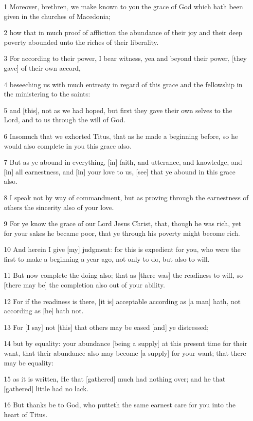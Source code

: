 \par 1 Moreover, brethren, we make known to you the grace of God which hath been given in the churches of Macedonia;
\par 2 how that in much proof of affliction the abundance of their joy and their deep poverty abounded unto the riches of their liberality.
\par 3 For according to their power, I bear witness, yea and beyond their power, [they gave] of their own accord,
\par 4 beseeching us with much entreaty in regard of this grace and the fellowship in the ministering to the saints:
\par 5 and [this], not as we had hoped, but first they gave their own selves to the Lord, and to us through the will of God.
\par 6 Insomuch that we exhorted Titus, that as he made a beginning before, so he would also complete in you this grace also.
\par 7 But as ye abound in everything, [in] faith, and utterance, and knowledge, and [in] all earnestness, and [in] your love to us, [see] that ye abound in this grace also.
\par 8 I speak not by way of commandment, but as proving through the earnestness of others the sincerity also of your love.
\par 9 For ye know the grace of our Lord Jesus Christ, that, though he was rich, yet for your sakes he became poor, that ye through his poverty might become rich.
\par 10 And herein I give [my] judgment: for this is expedient for you, who were the first to make a beginning a year ago, not only to do, but also to will.
\par 11 But now complete the doing also; that as [there was] the readiness to will, so [there may be] the completion also out of your ability.
\par 12 For if the readiness is there, [it is] acceptable according as [a man] hath, not according as [he] hath not.
\par 13 For [I say] not [this] that others may be eased [and] ye distressed;
\par 14 but by equality: your abundance [being a supply] at this present time for their want, that their abundance also may become [a supply] for your want; that there may be equality:
\par 15 as it is written, He that [gathered] much had nothing over; and he that [gathered] little had no lack.
\par 16 But thanks be to God, who putteth the same earnest care for you into the heart of Titus.
